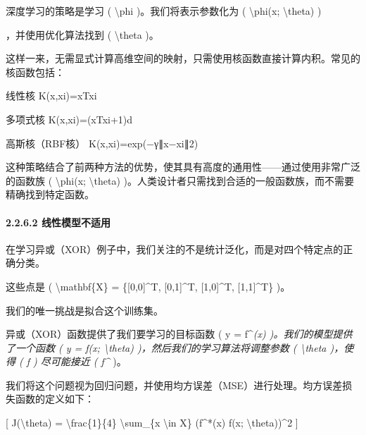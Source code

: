 深度学习的策略是学习 ( \textbackslash phi )。我们将表示参数化为 (
\textbackslash phi(x; \textbackslash theta)
)%

，并使用优化算法找到 ( \textbackslash theta )。

这样一来，无需显式计算高维空间的映射，只需使用核函数直接计算内积。常见的核函数包括：

线性核 K(x,xi)=xTxi

多项式核 K(x,xi)=(xTxi+1)d

高斯核（RBF核） K(x,xi)=exp(−γ∥x−xi∥2)

这种策略结合了前两种方法的优势，使其具有高度的通用性------通过使用非常广泛的函数族
( \textbackslash phi(x; \textbackslash theta)
)。人类设计者只需找到合适的一般函数族，而不需要精确找到特定函数。

\paragraph{\texorpdfstring{\textbf{2.2.6.2
线性模型不适用}}{2.2.6.2 线性模型不适用}}\label{2262-ux7ebfux6027ux6a21ux578bux4e0dux9002ux7528}

在学习异或（XOR）例子中，我们关注的不是统计泛化，而是对四个特定点的正确分类。

这些点是 ( \textbackslash mathbf\{X\} = \{{[}0,0{]}\^{}T,
{[}0,1{]}\^{}T, {[}1,0{]}\^{}T, {[}1,1{]}\^{}T\} )。


我们的唯一挑战是拟合这个训练集。

异或（XOR）函数提供了我们要学习的目标函数 ( y = f\^{}\emph{(x)
)。我们的模型提供了一个函数 ( y = f(x; \textbackslash theta)
)，然后我们的学习算法将调整参数 ( \textbackslash theta )，使得 ( f )
尽可能接近 ( f\^{}} )。

我们将这个问题视为回归问题，并使用均方误差（MSE）进行处理。均方误差损失函数的定义如下：

{[} J(\textbackslash theta) = \textbackslash frac\{1\}\{4\}
\textbackslash sum\_\{x \textbackslash in X\} (f\^{}*(x) f(x;
\textbackslash theta))\^{}2 {]}


